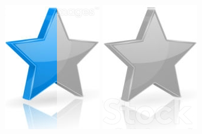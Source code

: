 \documentclass[10pt,a4paper,sans]{article}
\begin{document}
\begin{minipage}[t]{0.28\textwidth}
\begin{mdframed}[style=cadreCompetences]
\begin{itemize}
{                    \includegraphics[scale=0.20]{img/half_star.png} \hspace{-0.2cm}
                    \includegraphics[scale=0.20]{img/empty_star.png}}
            \end{itemize}

\end{mdframed}
\end{minipage}
\end{document}
